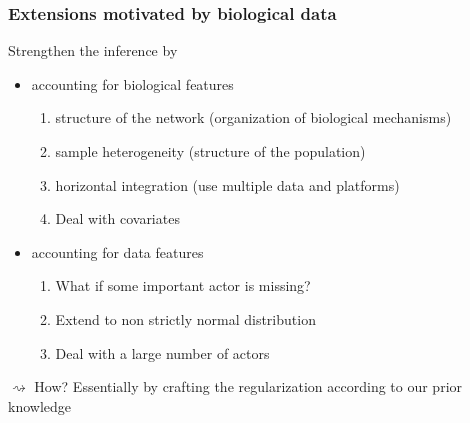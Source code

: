 \documentclass[10pt, c, xcolor=x11names]{beamer}\usepackage[]{graphicx}\usepackage[]{color}
\begin{document}
\begin{frame}
  \frametitle{Extensions motivated by biological data}

  \begin{block}{\alert{Strengthen the inference } by}
    \vspace{-.25cm}

    \begin{itemize}
    \item accounting for biological features

      \begin{enumerate}
      \item \alert{structure} of the network (organization of biological mechanisms)
      \item sample \alert{heterogeneity} (structure of the population)
      \item horizontal \alert{integration} (use multiple data and platforms)
      \item Deal with \alert{covariates}
      \end{enumerate}

    \item accounting for data features

      \begin{enumerate}
      \item What if some \alert{important actor is missing}?
      \item Extend to \alert{non strictly normal} distribution
      \item Deal with a \alert{large number} of actors
      \end{enumerate}
    \end{itemize}

  $\rightsquigarrow$ How? Essentially by crafting the regularization according to our prior knowledge

  \end{block}

\end{frame}

\end{document}

